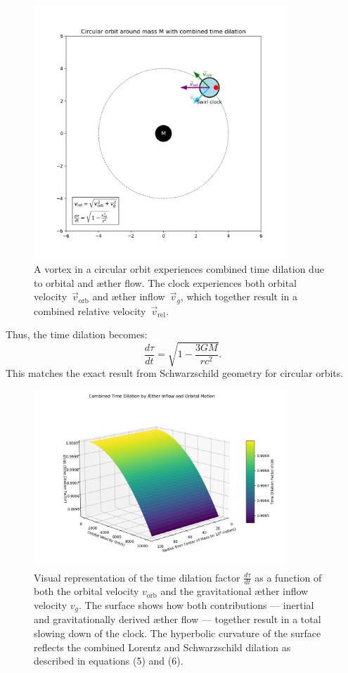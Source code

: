 \begin{figure}[htbp]
    \centering
    \includegraphics[width=0.85\textwidth]{08-BaanRondMassa}
    \caption{A vortex in a circular orbit experiences combined time dilation due to orbital and æther flow. The clock experiences both orbital velocity~$\vec{v}_{\mathrm{orb}}$ and æther inflow~$\vec{v}_g$, which together result in a combined relative velocity~$\vec{v}_{\mathrm{rel}}$.}
    \label{fig:BaanRondMassa}
\end{figure}

Thus, the time dilation becomes:
\[
\frac{d\tau}{dt} = \sqrt{1 - \frac{3GM}{rc^2}}. \tag{6}
\]
This matches the exact result from Schwarzschild geometry for circular orbits.

\begin{figure}[htbp]
    \centering
    \includegraphics[width=0.85\textwidth]{09-CombinedTimeDilationSurface}
    \caption{Visual representation of the time dilation factor \( \frac{d\tau}{dt} \) as a function of both the orbital velocity \( v_\text{orb} \) and the gravitational æther inflow velocity \( v_g \). The surface shows how both contributions — inertial and gravitationally derived æther flow — together result in a total slowing down of the clock. The hyperbolic curvature of the surface reflects the combined Lorentz and Schwarzschild dilation as described in equations (5) and (6).}
    \label{fig:TimeDialationCombined}
\end{figure}

